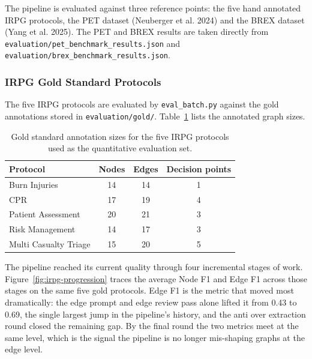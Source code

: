 \documentclass{article}
\begin{document}
The pipeline is evaluated against three reference points: the five
hand annotated IRPG protocols, the PET dataset (Neuberger et al.
2024) and the BREX dataset (Yang et al. 2025). The PET and BREX
results are taken directly from
\texttt{evaluation/pet\_benchmark\_results.json} and
\texttt{evaluation/brex\_benchmark\_results.json}.

\subsubsection{IRPG Gold Standard Protocols}

The five IRPG protocols are evaluated by \texttt{eval\_batch.py}
against the gold annotations stored in \texttt{evaluation/gold/}.
Table~\ref{tab:gold-sizes} lists the annotated graph sizes.

\begin{table}[H]
\centering
\begin{tabularx}{\textwidth}{X c c c}
\toprule
\textbf{Protocol} & \textbf{Nodes} & \textbf{Edges} & \textbf{Decision points} \\
\midrule
Burn Injuries        & 14 & 14 & 1 \\
CPR                  & 17 & 19 & 4 \\
Patient Assessment   & 20 & 21 & 3 \\
Risk Management      & 14 & 17 & 3 \\
Multi Casualty Triage & 15 & 20 & 5 \\
\bottomrule
\end{tabularx}
\caption{Gold standard annotation sizes for the five IRPG protocols
used as the quantitative evaluation set.}
\label{tab:gold-sizes}
\end{table}

The pipeline reached its current quality through four incremental
stages of work. Figure~\ref{fig:irpg-progression} traces the average
Node F1 and Edge F1 across those stages on the same five gold
protocols. Edge F1 is the metric that moved most dramatically: the
edge prompt and edge review pass alone lifted it from 0.43 to 0.69,
the single largest jump in the pipeline's history, and the anti over
extraction round closed the remaining gap. By the final round the
two metrics meet at the same level, which is the signal the pipeline
is no longer mis-shaping graphs at the edge level.
\end{document}
